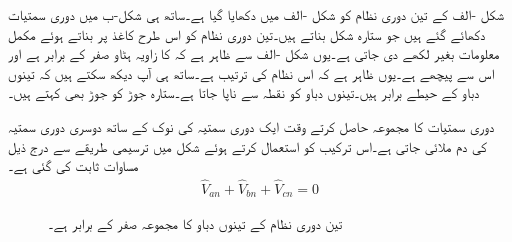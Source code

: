 شکل -الف کے تین دوری  نظام کو شکل -الف میں  دکھایا گیا ہے۔ساتھ ہی شکل-ب میں دوری سمتیات دکھائے گئے ہیں جو ستارہ شکل بناتے ہیں۔تین دوری نظام کو اس طرح کاغذ پر بناتے ہوئے مکمل معلومات بغیر لکھے دی جاتی ہے۔یوں شکل -الف سے ظاہر ہے کہ  کا زاویہ ہٹاو صفر کے برابر ہے اور  اس سے  پیچھے ہے۔یوں ظاہر ہے کہ اس نظام کی ترتیب  ہے۔ساتھ ہی آپ دیکھ سکتے ہیں کہ تینوں دباو کے حیطے برابر ہیں۔تینوں دباو کو نقطہ  سے ناپا جاتا ہے۔ستارہ جوڑ کو  جوڑ بھی کہتے ہیں۔

دوری سمتیات کا مجموعہ حاصل کرتے وقت ایک دوری سمتیہ کی نوک کے ساتھ دوسری دوری سمتیہ کی دم ملائی جاتی ہے۔اس ترکیب کو استعمال کرتے ہوئے شکل  میں ترسیمی طریقے سے درج ذیل مساوات ثابت کی گئی ہے۔
\begin{align}
\hat{V}_{an}+\hat{V}_{bn}+\hat{V}_{cn}=0
\end{align} 

\begin{figure}
\centering
{}
\caption{تین دوری نظام کے تینوں دباو کا مجموعہ صفر کے برابر ہے۔}
\label{شکل_تین_دوری_دباو_مجموعہ_صفر}
\end{figure}

